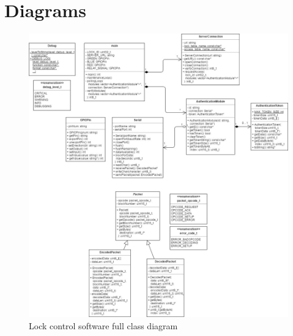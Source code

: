 \documentclass[12pt]{report}
\begin{document}

\printbibliography


\appendix



\chapter{Diagrams} \label{appendix:diagrams}

\begin{figure}
    \includegraphics[width=\textwidth]{Diagrams/Hardware-Diagrams/hardware_classes_full}
    \caption{Lock control software full class diagram}
    \label{fig:hardware-classes-full}
\end{figure}
\end{document}
